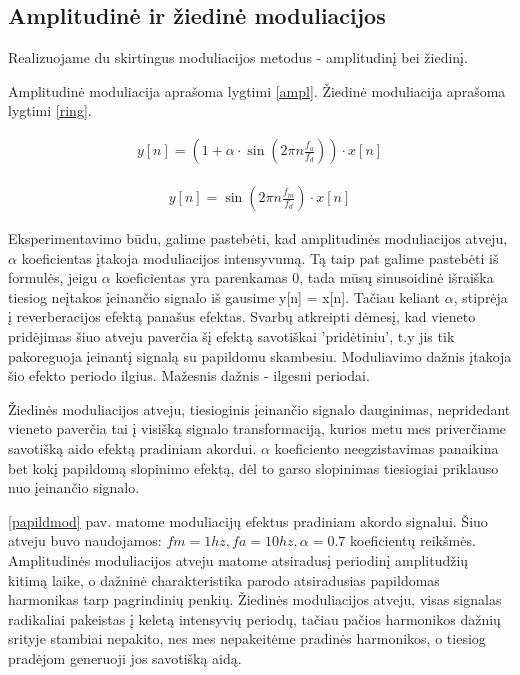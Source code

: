 \documentclass[10pt,a4paper,twocolumn]{article}
\begin{document}
\subsection*{Amplitudinė ir žiedinė moduliacijos}

Realizuojame du skirtingus moduliacijos metodus - amplitudinį bei žiedinį.

Amplitudinė moduliacija aprašoma lygtimi \ref{ampl}. Žiedinė moduliacija aprašoma lygtimi \ref{ring}.


\begin{eqnarray}
y[n] = (1 + \alpha \cdot \sin(2 \pi n \frac{f_a}{f_d}))\cdot x[n]
\label{ampl}
\end{eqnarray}

\begin{eqnarray}
y[n] = \sin(2 \pi n \frac{f_m}{f_d})\cdot x[n]
\label{ring}
\end{eqnarray}



Eksperimentavimo būdu, galime pastebėti, kad amplitudinės moduliacijos atveju, $\alpha$ koeficientas įtakoja moduliacijos intensyvumą. Tą taip pat galime pastebėti iš formulės, jeigu $\alpha$ koeficientas yra parenkamas 0, tada mūsų sinusoidinė išraiška tiesiog neįtakos įeinančio signalo iš gausime y[n] = x[n]. Tačiau keliant $\alpha$, stiprėja į reverberacijos efektą panašus efektas. Svarbų atkreipti dėmesį, kad vieneto pridėjimas šiuo atveju paverčia šį efektą savotiškai 'pridėtiniu', t.y jis tik pakoreguoja įeinantį signalą su papildomu skambesiu. Moduliavimo dažnis įtakoja šio efekto periodo ilgius. Mažesnis dažnis - ilgesni periodai.

Žiedinės moduliacijos atveju, tiesioginis įeinančio signalo dauginimas, nepridedant vieneto paverčia tai į visišką signalo transformaciją, kurios metu mes priverčiame savotišką aido efektą pradiniam akordui. $\alpha$ koeficiento neegzistavimas panaikina bet kokį papildomą slopinimo efektą, dėl to garso slopinimas tiesiogiai priklauso nuo įeinančio signalo. 

\ref{papildmod} pav. matome moduliacijų efektus pradiniam akordo signalui. Šiuo atveju buvo naudojamos: $fm=1hz, fa=10hz, \alpha=0.7$ koeficientų reikšmės. Amplitudinės moduliacijos atveju matome atsiradusį periodinį amplitudžių kitimą laike, o dažninė charakteristika parodo atsiradusias papildomas harmonikas tarp pagrindinių penkių. Žiedinės moduliacijos atveju, visas signalas radikaliai pakeistas į keletą intensyvių periodų, tačiau pačios harmonikos dažnių srityje stambiai nepakito, nes mes nepakeitėme pradinės harmonikos, o tiesiog pradėjom generuoji jos savotišką aidą.
\end{document}

